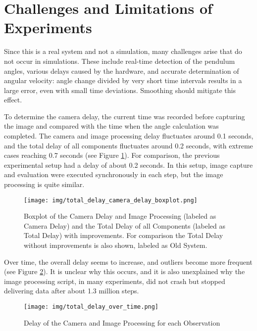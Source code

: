 \section{Challenges and Limitations of Experiments}

Since this is a real system and not a simulation, many challenges arise that do not occur in simulations. These include real-time detection of the pendulum angles, various delays caused by the hardware, and accurate determination of angular velocity: angle change divided by very short time intervals results in a large error, even with small time deviations. Smoothing should mitigate this effect.

To determine the camera delay, the current time was recorded before capturing the image and compared with the time when the angle calculation was completed. The camera and image processing delay fluctuates around 0.1 seconds, and the total delay of all components fluctuates around 0.2 seconds, with extreme cases reaching 0.7 seconds (see Figure \ref{fig:camera_delay_boxplot}). For comparison, the previous experimental setup had a delay of about 0.2 seconds. In this setup, image capture and evaluation were executed synchronously in each step, but the image processing is quite similar.
\begin{figure}
    \centering
    \texttt{[image: img/total\_delay\_camera\_delay\_boxplot.png]}
    \caption{Boxplot of the Camera Delay and Image Processing (labeled as Camera Delay) and the Total Delay of all Components (labeled as Total Delay) with improvements. For comparison the Total Delay without improvements is also shown, labeled as Old System.}
    \label{fig:camera_delay_boxplot}
\end{figure}
Over time, the overall delay seems to increase, and outliers become more frequent (see Figure \ref{fig:total_delay_over_time}). It is unclear why this occurs, and it is also unexplained why the image processing script, in many experiments, did not crash but stopped delivering data after about 1.3 million steps.
\begin{figure}
    \centering
    \texttt{[image: img/total\_delay\_over\_time.png]}
    \caption{Delay of the Camera and Image Processing for each Observation}
    \label{fig:total_delay_over_time}
\end{figure}